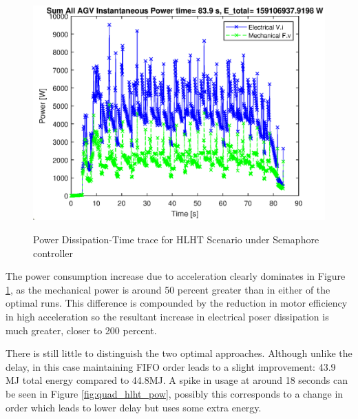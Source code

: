 \begin{figure}
\includegraphics[width=1.0\linewidth]{results_fig/IC-Semaphore-HLHT-powersum.eps}
\label{fig:sema_hlht_pow}
\caption{Power Dissipation-Time trace for HLHT Scenario under Semaphore controller}
\end{figure}

The power consumption increase due to acceleration clearly dominates in Figure \ref{fig:sema_hlht_pow}, as the mechanical power is around 50 percent greater than in either of the optimal runs. This difference is compounded by the reduction in motor efficiency in high acceleration so the resultant increase in electrical poser dissipation is much greater, closer to 200 percent. 

There is still little to distinguish the two optimal approaches. Although unlike the delay, in this case maintaining FIFO order leads to a slight improvement: 43.9 MJ total energy compared to 44.8MJ. A spike in usage at around 18 seconds can be seen in Figure \ref{fig:quad_hlht_pow}, possibly this corresponds to a change in order which leads to lower delay but uses some extra energy. 


